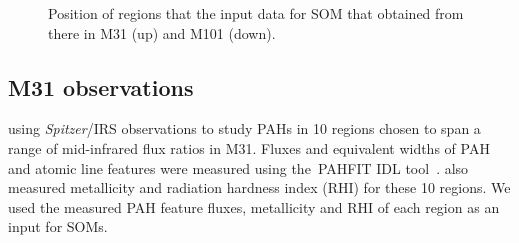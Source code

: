   \begin{figure}
    \hfill
    \caption{Position of regions that the input data for SOM that obtained from there in M31 (up) and M101 (down).}
    \label{fig:dummy}
  \end{figure}

    \subsection{M31 observations}
     \label{Sec: data_M31_SOMN} 
     
     \cite{Dim15} using {\it Spitzer}/IRS observations to study PAHs in 10 regions chosen to span a range of mid-infrared flux ratios in M31. 
     Fluxes and equivalent widths of PAH and atomic line features were measured using the~{\sc PAHFIT IDL} tool~\citep{Smith07b}.
     \cite{Dim15} also measured metallicity and radiation hardness index (RHI) for these 10 regions.
     We used the measured PAH feature fluxes, metallicity and RHI of each region as an input for SOMs.
     

